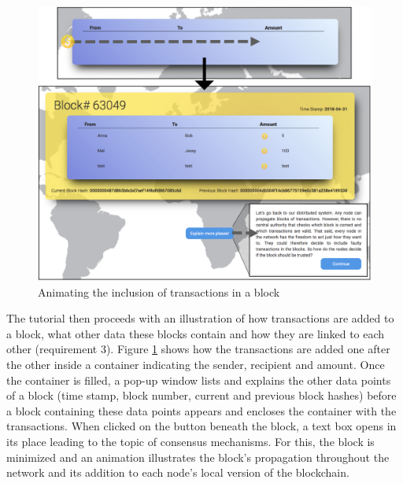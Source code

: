 \begin{figure}
    \centering
      \includegraphics[width=\textwidth]{latex-vorlage_v1.5/graphics/Animations3Block.png} 
    \caption{Animating the inclusion of transactions in a block}
    \label{fig:AnimationBlock}
\end{figure}

The tutorial then proceeds with an illustration of how transactions are added to a block, what other data these blocks contain and how they are linked to each other (requirement 3). Figure \ref{fig:AnimationBlock} shows how the transactions are added one after the other inside a container indicating the sender, recipient and amount. Once the container is filled, a pop-up window lists and explains the other data points of a block (time stamp, block number, current and previous block hashes) before a block containing these data points appears and encloses the container with the transactions. When clicked on the button beneath the block, a text box opens in its place leading to the topic of consensus mechanisms. For this, the block is minimized and an animation illustrates the block's propagation throughout the network and its addition to each node's local version of the blockchain.

